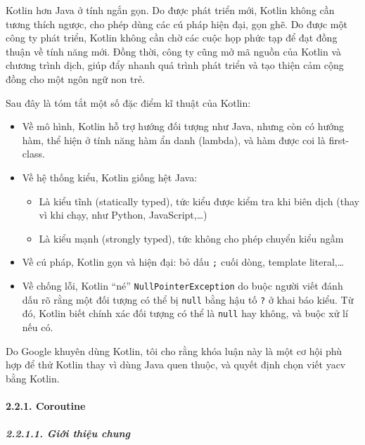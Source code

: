 \documentclass[
]{article}
\providecommand{\tightlist}{%
  \setlength{\itemsep}{0pt}\setlength{\parskip}{0pt}}
\begin{document}
Kotlin hơn Java ở tính ngắn gọn. Do được phát triển mới, Kotlin không
cần tương thích ngược, cho phép dùng các cú pháp hiện đại, gọn ghẽ. Do
được một công ty phát triển, Kotlin không cần chờ các cuộc họp phức tạp
để đạt đồng thuận về tính năng mới. Đồng thời, công ty cũng mở mã nguồn
của Kotlin và chương trình dịch, giúp đẩy nhanh quá trình phát triển và
tạo thiện cảm cộng đồng cho một ngôn ngữ non trẻ.

Sau đây là tóm tắt một số đặc điểm kĩ thuật của Kotlin:

\begin{itemize}
\tightlist
\item
  Về mô hình, Kotlin hỗ trợ hướng đối tượng như Java, nhưng còn có hướng
  hàm, thể hiện ở tính năng hàm ẩn danh (lambda), và hàm được coi là
  first-class.
\item
  Về hệ thống kiểu, Kotlin giống hệt Java:

  \begin{itemize}
  \tightlist
  \item
    Là kiểu tĩnh (statically typed), tức kiểu được kiểm tra khi biên
    dịch (thay vì khi chạy, như Python, JavaScript,\ldots)
  \item
    Là kiểu mạnh (strongly typed), tức không cho phép chuyển kiểu ngầm
  \end{itemize}
\item
  Về cú pháp, Kotlin gọn và hiện đại: bỏ dấu \texttt{;} cuối dòng,
  template literal,\ldots{}
\item
  Về chống lỗi, Kotlin ``né'' \texttt{NullPointerException} do buộc
  người viết đánh dấu rõ rằng một đối tượng có thể bị \texttt{null} bằng
  hậu tố \texttt{?} ở khai báo kiểu. Từ đó, Kotlin biết chính xác đối
  tượng có thể là \texttt{null} hay không, và buộc xử lí nếu có.
\end{itemize}

Do Google khuyên dùng Kotlin, tôi cho rằng khóa luận này là một cơ hội
phù hợp để thử Kotlin thay vì dùng Java quen thuộc, và quyết định chọn
viết yacv bằng Kotlin.

\hypertarget{coroutine}{%
\paragraph{\texorpdfstring{2.2.1. Coroutine
}{2.2.1. Coroutine }}\label{coroutine}}

\hypertarget{giux1edbi-thiux1ec7u-chung}{%
\subparagraph{2.2.1.1. Giới thiệu
chung}\label{giux1edbi-thiux1ec7u-chung}}
\end{document}
